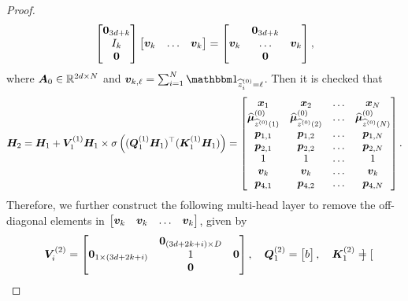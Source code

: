 \begin{proof}
\begin{align*}
\begin{bmatrix}
        \boldsymbol{0}_{3d+k}\\
        I_k\\
        \boldsymbol{0}
    \end{bmatrix}\begin{bmatrix}
        \boldsymbol{v}_k&\ldots&\boldsymbol{v}_k
    \end{bmatrix}=\begin{bmatrix}
        &\boldsymbol{0}_{3d+k}&\\
        \boldsymbol{v}_k&\ldots&\boldsymbol{v}_k\\
        &\boldsymbol{0}&
    \end{bmatrix},
\end{align*}
 where $\boldsymbol{A}_0\in\mathbb{R}^{2d\times N}$ and $
    \bfa v_{k,\ell}=\sum_{i=1}^N\mbbm 1_{\wh z_i^{(0)}=\ell}$.
Then it is checked that
\begin{align*}
   \boldsymbol{H}_2 =  \boldsymbol{H}_1+ \boldsymbol{V}_1^{(1)}\boldsymbol{H}_1\times\sigma\left((\boldsymbol{Q}_1^{(1)}\boldsymbol{H}_1)^\top(\boldsymbol{K}_1^{(1)}\boldsymbol{H}_1)\right)=\begin{bmatrix}
        \boldsymbol{x}_1&\boldsymbol{x}_2&\ldots&\boldsymbol{x}_N\\
        \widehat{\boldsymbol{\mu}}_{\widehat{z}^{(0)}(1)}^{(0)}&\widehat{\boldsymbol{\mu}}_{\widehat{z}^{(0)}(2)}^{(0)}&\ldots&\widehat{\boldsymbol{\mu}}_{\widehat{z}^{(0)}(N)}^{(0)}\\
        \boldsymbol{p}_{1,1}&\boldsymbol{p}_{1,2}&\ldots&\boldsymbol{p}_{1,N}\\
        \boldsymbol{p}_{2,1}&\boldsymbol{p}_{2,2}&\ldots&\boldsymbol{p}_{2,N}\\
        1&1&\ldots&1\\
        \boldsymbol{v}_k&\boldsymbol{v}_k&\ldots&\boldsymbol{v}_k\\
        \boldsymbol{p}_{4,1}& \boldsymbol{p}_{4,2}&\ldots &\boldsymbol{p}_{4,N}
    \end{bmatrix}.
\end{align*}
Therefore, we further construct the following multi-head layer to remove the off-diagonal elements in $\begin{bmatrix}
    \boldsymbol{v}_k&\boldsymbol{v}_k&\ldots&\boldsymbol{v}_k
\end{bmatrix}$, given by 
\begin{align*}
    \boldsymbol{V}_i^{(2)} = \begin{bmatrix}
        &\boldsymbol{0}_{(3d+2k+i)\times D}&\\
        \boldsymbol{0}_{1\times(3d+2k+i)}&1&\boldsymbol{0}\\
        &\boldsymbol{0}&
    \end{bmatrix},\quad \boldsymbol{Q}_1^{(2)} = \begin{bmatrix}
        b
    \end{bmatrix},\quad\boldsymbol{K}_1^{(2)} = \begin{bmatrix}

\end{bmatrix}
\end{align*}
\end{proof}
